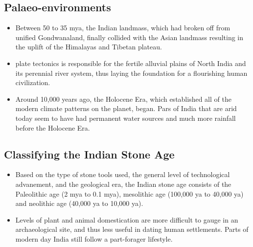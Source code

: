 \subsection{Palaeo-environments}
\begin{itemize}
    \item Between 50 to 35 mya, the Indian landmass, which had broken off from unified Gondwanaland, finally collided with the Asian landmass resulting in the uplift of the Himalayas and Tibetan plateau.
    \item \Gls{plate tectonics} is responsible for the fertile alluvial plains of North India and its perennial river system, thus laying the foundation for a flourishing human civilization.
    \item Around 10,000 years ago, the Holocene Era, which established all of the modern climate patterns on the planet, began. Pars of India that are arid today seem to have had permanent water sources and much more rainfall before the Holocene Era.
\end{itemize}

\subsection{Classifying the Indian Stone Age}
\begin{itemize}
    \item Based on the type of stone tools used, the general level of technological advanement, and the geological era, the Indian stone age consists of the Paleolithic age (2 mya to 0.1 mya), \Gls{mesolithic age} (100,000 ya to 40,000 ya) and \Gls{neolithic age} (40,000 ya to 10,000 ya).
    \item Levels of plant and animal domestication are more difficult to gauge in an archaeological site, and thus less useful in dating human settlements. Parts of modern day India still follow a part-forager lifestyle.
\end{itemize}

